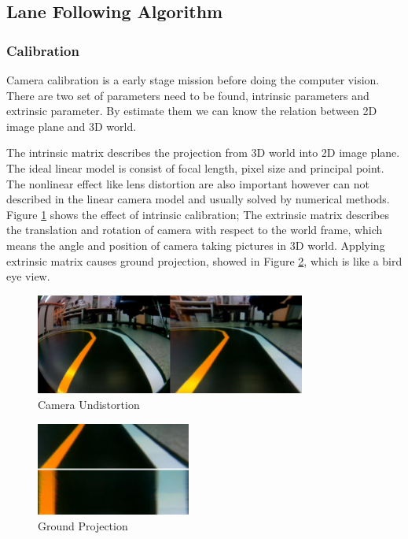 \documentclass[conference]{IEEEtran}
\begin{document}
\subsection{Lane Following Algorithm}

\subsubsection{Calibration}

Camera calibration is a early stage mission before doing the computer vision. There are two set of parameters need to be found, intrinsic parameters and extrinsic parameter. By estimate them we can know the relation between 2D image plane and 3D world.

The intrinsic matrix describes the projection from 3D world into 2D image plane. The ideal linear model is consist of focal length, pixel size and principal point. The nonlinear effect like lens distortion are also important however can not described in the linear camera model and usually solved by numerical methods. Figure \ref{fig:intrinsic} shows the effect of intrinsic calibration; The extrinsic matrix describes the translation and rotation of camera with respect to the world frame, which means the angle and position of camera taking pictures in 3D world. Applying extrinsic matrix causes ground projection, showed in Figure \ref{fig:extrinsic}, which is like a bird eye view.

\begin{figure}
\centering
\includegraphics[width=3.5in]{img/intrinsic.png}
\caption{Camera Undistortion}
\label{fig:intrinsic}
\end{figure}

\begin{figure}
\centering
\includegraphics[width=2in]{img/extrinsic.png}
\caption{Ground Projection}
\label{fig:extrinsic}
\end{figure}
\end{document}
